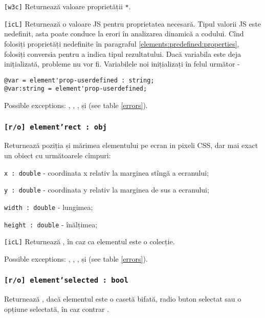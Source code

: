 \texttt{[w3c]} Returnează valoare proprietății \texttt{*}.

\texttt{[icL]}  Returnează o valoare JS pentru proprietatea necesară. Tipul valorii JS este nedefinit, asta poate conduce la erori în analizarea dinamică a codului. Cînd folosiți proprietăți nedefinite în paragraful \ref{elements:predefined:properties}, folosiți conversia pentru a indica tipul rezultatului. Dacă variabila este deja inițializată, probleme nu vor fi. Variabilele noi inițializați în felul următor -
\begin{verbatim}
@var = element'prop-userdefined : string;
@var:string = element'prop-userdefined;
\end{verbatim}

Possible exceptions: , , ,  și  (see table \ref{errors}).

\subsubsection{\texttt{[r/o] element'rect : obj}}

Returnează poziția și mărimea elementului pe ecran in pixeli CSS, dar mai exact un obiect cu următoarele cîmpuri:
\begin{icItems}
	\item \texttt{x : double} - coordinata x relativ la marginea stîngă a ecranului;
	\item \texttt{y : double} - coordinata y relativ la marginea de sus a ecranului;
	\item \texttt{width : double} - lungimea;
	\item \texttt{height : double} - înălțimea;
\end{icItems}

\texttt{[icL]} Returnează \set, în caz ca elementul este o colecție.

Possible exceptions: , , ,  și  (see table \ref{errors}).

\subsubsection{\texttt{[r/o] element'selected : bool}}

Returnează \true, dacă elementul este o casetă bifată, radio buton selectat sau o opțiune selectată, în caz contrar \false.

